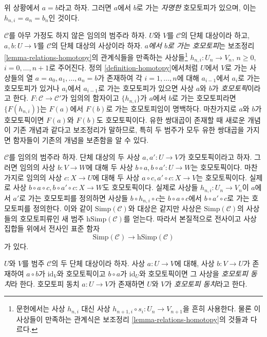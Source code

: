 \begin{example}
\label{example-trivial-homotopy}
위 상황에서 $a = b$라고 하자. 그러면 $a$에서 $b$로 가는
{\it 자명한} 호모토피가 있으며, 이는 $h_{n, i} = a_n = b_n$인 것이다.
\end{example}

\begin{remark}
\label{remark-homotopy-better}
$\mathcal{C}$를 아무 가정도 하지 않은 임의의 범주라 하자. $U$와 $V$를
$\mathcal{C}$의 단체 대상이라 하고, $a, b : U \to V$를
$\mathcal{C}$의 단체 대상의 사상이라 하자. {\it $a$에서 $b$로 가는
호모토피}는 보조정리 \ref{lemma-relations-homotopy}의 관계식들을 만족하는
사상들\footnote{문헌에서는 사상 $h_{n, i}$ 대신 사상
$h_{n + 1, i} \circ s_i : U_n \to V_{n + 1}$을 흔히 사용한다.
물론 이 사상들이 만족하는 관계식은 보조정리
\ref{lemma-relations-homotopy}의 것들과 다르다.}
$h_{n, i} : U_n \to V_n$, $n \geq 0$, $i = 0, \ldots, n + 1$로 주어진다.
정의 \ref{definition-homotopy}에서처럼 $U$에서 $V$로 가는 사상들의 열
$a = a_0, a_1, \ldots, a_n = b$가 존재하여 각 $i = 1, \ldots, n$에
대해 $a_{i - 1}$에서 $a_i$로 가는 호모토피가 있거나 $a_i$에서
$a_{i - 1}$로 가는 호모토피가 있으면 사상 $a$와 $b$가
{\it 호모토픽}이라고 한다. $F : \mathcal{C} \to \mathcal{C}'$가 임의의
함자이고 $\{h_{n, i}\}$가 $a$에서 $b$로 가는 호모토피라면
$\{F(h_{n, i})\}$는 $F(a)$에서 $F(b)$로 가는 호모토피임이 명백하다.
마찬가지로 $a$와 $b$가 호모토픽이면 $F(a)$와 $F(b)$도 호모토픽이다.
유한 쌍대곱이 존재할 때 새로운 개념이 기존 개념과 같다고 보조정리가
말하므로, 특히 두 범주가 모두 유한 쌍대곱을 가지면 함자들이 기존의
개념을 보존함을 알 수 있다.
\end{remark}

\begin{remark}
\label{remark-homotopy-pre-post-compose}
$\mathcal{C}$를 임의의 범주라 하자. 단체 대상의 두 사상
$a, a' : U \to V$가 호모토픽이라고 하자. 그러면 임의의 사상
$b : V \to W$에 대해 두 사상 $b \circ a, b \circ a' : U \to W$는
호모토픽이다. 마찬가지로 임의의 사상 $c : X \to U$에 대해 두 사상
$a \circ c, a' \circ c : X \to V$는 호모토픽이다. 실제로 사상
$b \circ a \circ c, b \circ a' \circ c : X \to W$도 호모토픽이다.
실제로 사상들 $h_{n, i} : U_n \to V_n$이 $a$에서 $a'$로 가는 호모토피를
정의하면 사상들 $b \circ h_{n, i} \circ c$는
$b \circ a \circ c$에서 $b \circ a' \circ c$로 가는 호모토피를 정의한다.
이와 같이 $\text{Simp}(\mathcal{C})$와 대상은 같지만 사상은
$\text{Simp}(\mathcal{C})$의 사상들의 호모토피류인 새 범주
$\text{hSimp}(\mathcal{C})$를 얻는다. 따라서 본질적으로 전사이고
사상 집합들 위에서 전사인 표준 함자
$$
\text{Simp}(\mathcal{C})
\longrightarrow
\text{hSimp}(\mathcal{C})
$$
가 있다.
\end{remark}
\begin{definition}
\label{definition-homotopy-equivalent}
$U$와 $V$를 범주 $\mathcal{C}$의 두 단체 대상이라 하자. 사상
$a : U \to V$에 대해, 사상 $b : V \to U$가 존재하여
$a \circ b$가 $\text{id}_V$와 호모토픽이고 $b \circ a$가
$\text{id}_U$와 호모토픽이면 그 사상을 {\it 호모토피 동치}라 한다.
호모토피 동치 $a : U \to V$가 존재하면 $U$와 $V$가
{\it 호모토피 동치}라고 한다.
\end{definition}

